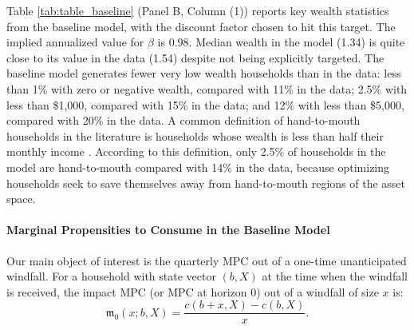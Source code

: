 

Table \ref{tab:table_baseline} (Panel B, Column (1)) reports key wealth statistics from the baseline model, with the discount factor chosen to hit this target. The implied annualized value for $\beta$ is $0.98$. Median wealth in the model (1.34) is quite close to its value in the  data (1.54) despite not being explicitly targeted. The baseline model generates fewer very low wealth households than in the data: less than 1\% with zero or negative wealth, compared with 11\% in the data; 2.5\% with less than \$1,000, compared with 15\% in the data; and 12\% with less than \$5,000, compared with 20\% in the data. A common definition of hand-to-mouth households in the literature is households whose wealth is less than half their monthly income \citet{kaplan2014wealthy}. According to this definition, only 2.5\% of households in the model are hand-to-mouth compared with 14\% in the data, because optimizing households seek to save themselves away from hand-to-mouth regions of the asset space. 


\paragraph{Marginal Propensities to Consume in the Baseline Model}
Our main object of interest is the quarterly MPC out of a one-time unanticipated windfall. For a household with state vector $\left( b,X\right)$ at the time when the windfall is received, the impact MPC (or MPC at horizon $0$) out of a windfall of size $x$ is: 
\begin{equation}
\mathfrak{m}_{0}\left(x;b,X\right) =\frac{c\left( b+x,X\right) -c\left( b,X\right) }{x}.
\label{eq:impactMPC_discrete}
\end{equation}

%

